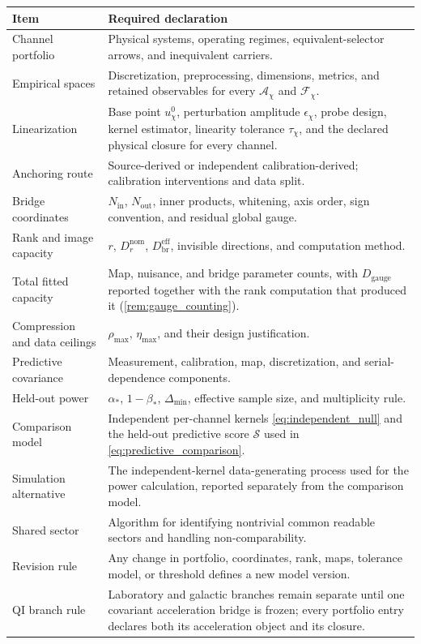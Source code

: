 \documentclass[11pt]{article}
\begin{document}
\begin{longtable}{>{\raggedright\arraybackslash}p{}>{\raggedright\arraybackslash}p{}}
\toprule
Item & Required declaration \\
\midrule
Channel portfolio & Physical systems, operating regimes, equivalent-selector arrows, and inequivalent carriers. \\
Empirical spaces & Discretization, preprocessing, dimensions, metrics, and retained observables for every \(\mathcal A_{\chi}\) and \(\mathcal F_{\chi}\). \\
Linearization & Base point \(u_{\chi}^{0}\), perturbation amplitude \(\epsilon_{\chi}\), probe design, kernel estimator, linearity tolerance \(\tau_{\chi}\), and the declared physical closure for every channel. \\
Anchoring route & Source-derived or independent calibration-derived; calibration interventions and data split. \\
Bridge coordinates & \(N_{\mathrm{in}}\), \(N_{\mathrm{out}}\), inner products, whitening, axis order, sign convention, and residual global gauge. \\
Rank and image capacity & \(r\), \(D_r^{\mathrm{nom}}\), \(D_{\mathrm{br}}^{\mathrm{eff}}\), invisible directions, and computation method. \\
Total fitted capacity & Map, nuisance, and bridge parameter counts, with \(D_{\mathrm{gauge}}\) reported together with the rank computation that produced it (\cref{rem:gauge_counting}). \\
Compression and data ceilings & \(\rho_{\max}\), \(\eta_{\max}\), and their design justification. \\
Predictive covariance & Measurement, calibration, map, discretization, and serial-dependence components. \\
Held-out power & \(\alpha_*\), \(1-\beta_*\), \(\Delta_{\min}\), effective sample size, and multiplicity rule. \\
Comparison model & Independent per-channel kernels \cref{eq:independent_null} and the held-out predictive score \(\mathcal S\) used in \cref{eq:predictive_comparison}. \\
Simulation alternative & The independent-kernel data-generating process used for the power calculation, reported separately from the comparison model. \\
Shared sector & Algorithm for identifying nontrivial common readable sectors and handling non-comparability. \\
Revision rule & Any change in portfolio, coordinates, rank, maps, tolerance model, or threshold defines a new model version. \\
QI branch rule & Laboratory and galactic branches remain separate until one covariant acceleration bridge is frozen; every portfolio entry declares both its acceleration object and its closure. \\
\bottomrule
\end{longtable}
\end{document}
